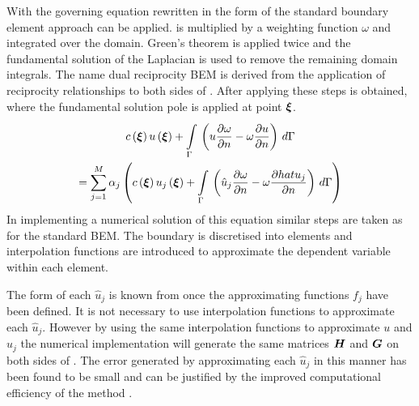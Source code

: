 With the governing equation rewritten in the form of  the
standard boundary element approach can be applied.  is
multiplied by a weighting function $\omega$ and integrated over the domain.
Green's theorem is applied twice and the fundamental solution of the
Laplacian is used to remove the remaining domain integrals. The name dual
reciprocity BEM is derived from the application of reciprocity
relationships to both sides of . After applying these
steps  is obtained, where the fundamental solution pole
is applied at point $\vect{\xi}$.
\begin{multline}
  \fnof{c}{\vect{\xi}} \fnof{u}{\vect{\xi}} + \goneint{\pbrac{u
    \delby{\omega}{n} - \omega \delby{u}{n}}}{\Gamma} \\ =
  \dsuml{j=1}{M} \alpha_{j} \pbrac{\fnof{c}{\vect{\xi}}
    \fnof{u_{j}}{\vect{\xi}} + \goneint{\pbrac{\hat{u}_{j}
      \delby{\omega}{n} - \omega \delby{hat{u}_{j}}{n}}}{\Gamma}}
\label{eq:drmmaths}
\end{multline}
In implementing a 
numerical solution of this equation similar steps are taken as for 
the standard BEM.  The boundary is
discretised into elements and interpolation functions are introduced to
approximate the dependent variable within each element. 

The form of each $\hat{u}_{j}$ is known from  once the
approximating functions $f_{j}$ have been defined. It is not necessary to
use interpolation functions to approximate each $\hat{u}_{j}$. However by
using the same interpolation functions to approximate $u$ and $\hat{u}_{j}$
the numerical implementation will generate the same matrices $\matr{H}$ and
$\matr{G}$ on both sides of . The error generated by
approximating each $\hat{u}_{j}$ in this manner has been found to be small
and can be justified by the improved computational efficiency of the method
\cite{partridge:1992}.

